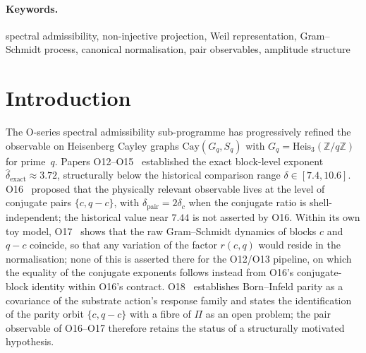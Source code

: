 \documentclass[11pt,a4paper]{article}
\theoremstyle{remark}
\newcommand{\dpair}{\delta_{\mathrm{pair}}}
\newcommand{\dc}{\delta_{c}}
\newcommand{\rcq}{r(c,q)}
\newcommand{\Heis}{\mathrm{Heis}_{3}(\mathbb{Z}/q\mathbb{Z})}
\begin{document}
  \paragraph{Keywords.}
    spectral admissibility, non-injective projection, Weil representation,
    Gram–Schmidt process, canonical normalisation, pair observables, amplitude structure

    \clearpage
    \tableofcontents

    \clearpage

  \section{Introduction}
  \label{sec:intro}


  The O-series spectral admissibility sub-programme has progressively refined
  the observable on Heisenberg Cayley graphs
  $\mathrm{Cay}(G_{q}, S_{q})$ with $G_{q} = \Heis$ for prime~$q$.
  Papers O12--O15~\cite{Beau2026a16,Beau2026a17,Beau2026a18,Beau2026a19}
  established the exact block-level exponent
  $\hat{\delta}_{\mathrm{exact}} \approx 3.72$, structurally below the
  historical comparison range $\delta \in [7.4, 10.6]$.
  O16~\cite{Beau2026a20} proposed that the physically relevant
  observable lives at the level of conjugate pairs $\{c, q-c\}$,
  with $\dpair = 2\dc$ when the conjugate ratio is shell-independent; the historical value near $7.44$ is not asserted by O16.
  Within its own toy model, O17~\cite{Beau2026a21} shows that the raw Gram--Schmidt
  dynamics of blocks $c$ and $q-c$ coincide, so that any variation of the factor $\rcq$ would
  reside in the normalisation; none of this is asserted there for the O12/O13 pipeline, on
  which the equality of the conjugate exponents follows instead from O16's conjugate-block
  identity within O16's contract.
  O18~\cite{Beau2026a22} establishes Born--Infeld parity as a covariance of the substrate action's response family
  and states the identification of the parity orbit $\{c, q-c\}$ with a fibre of $\Pi$ as an open problem;
  the pair observable of O16--O17 therefore retains the status of a structurally motivated hypothesis.
\end{document}

